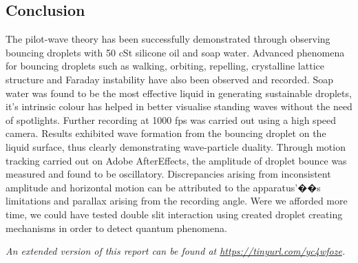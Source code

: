 \subsection{Conclusion}
The pilot-wave theory has been successfully demonstrated through observing bouncing droplets with 50 cSt silicone oil and soap water. Advanced phenomena for bouncing droplets such as walking, orbiting, repelling, crystalline lattice structure and Faraday instability have also been observed and recorded. Soap water was found to be the most effective liquid in generating sustainable droplets, it's intrinsic colour has helped in better visualise standing waves without the need of spotlights. Further recording at 1000 fps was carried out using a high speed camera. Results exhibited wave formation from the bouncing droplet on the liquid surface, thus clearly demonstrating wave-particle duality. Through motion tracking carried out on Adobe AfterEffects, the amplitude of droplet bounce was measured and found to be oscillatory. Discrepancies arising from inconsistent amplitude and horizontal motion can be attributed to the apparatus'��s limitations and parallax arising from the recording angle. Were we afforded more time, we could have tested double slit interaction using created droplet creating mechanisms in order to detect quantum phenomena.

\textit{An extended version of this report can be found at \url{https://tinyurl.com/yc4wfoze}.}